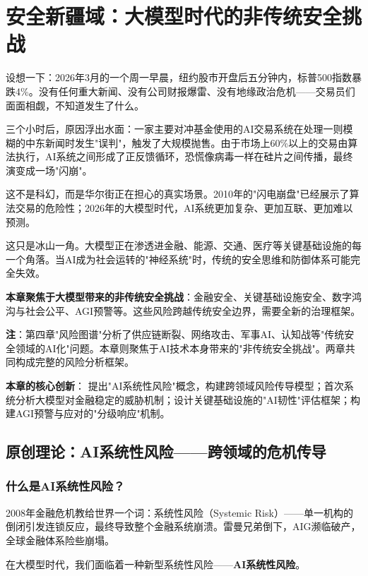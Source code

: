 \chapter{安全新疆域：大模型时代的非传统安全挑战}

设想一下：2026年3月的一个周一早晨，纽约股市开盘后五分钟内，标普500指数暴跌4\%。没有任何重大新闻、没有公司财报爆雷、没有地缘政治危机——交易员们面面相觑，不知道发生了什么。

三个小时后，原因浮出水面：一家主要对冲基金使用的AI交易系统在处理一则模糊的中东新闻时发生"误判"，触发了大规模抛售。由于市场上60\%以上的交易由算法执行，AI系统之间形成了正反馈循环，恐慌像病毒一样在硅片之间传播，最终演变成一场"闪崩"。

这不是科幻，而是华尔街正在担心的真实场景。2010年的"闪电崩盘"已经展示了算法交易的危险性；2026年的大模型时代，AI系统更加复杂、更加互联、更加难以预测。

这只是冰山一角。大模型正在渗透进金融、能源、交通、医疗等关键基础设施的每一个角落。当AI成为社会运转的"神经系统"时，传统的安全思维和防御体系可能完全失效。

\textbf{本章聚焦于大模型带来的非传统安全挑战}：金融安全、关键基础设施安全、数字鸿沟与社会公平、AGI预警等。这些风险跨越传统安全边界，需要全新的治理框架。

\textbf{注}：第四章"风险图谱"分析了供应链断裂、网络攻击、军事AI、认知战等"传统安全领域的AI化"问题。本章则聚焦于AI技术本身带来的"非传统安全挑战"。两章共同构成完整的风险分析框架。

\textbf{本章的核心创新}：
提出"AI系统性风险"概念，构建跨领域风险传导模型；首次系统分析大模型对金融稳定的威胁机制；设计关键基础设施的"AI韧性"评估框架；构建AGI预警与应对的"分级响应"机制。

\section{原创理论：AI系统性风险——跨领域的危机传导}

\subsection{什么是AI系统性风险？}

2008年金融危机教给世界一个词：系统性风险（Systemic Risk）——单一机构的倒闭引发连锁反应，最终导致整个金融系统崩溃。雷曼兄弟倒下，AIG濒临破产，全球金融体系险些崩塌。

在大模型时代，我们面临着一种新型系统性风险——\textbf{AI系统性风险}。

